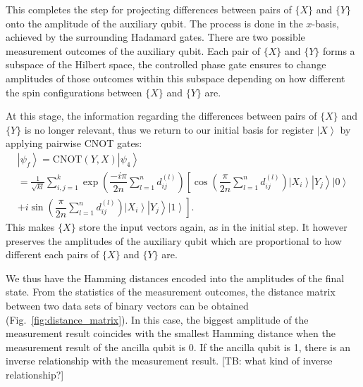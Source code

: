 \documentclass[pra,showkeys,twocolumn,showpacs]{revtex4-1}
\begin{document}
%
This completes the step for projecting differences between pairs of $\{X\}$ and $\{Y\}$ onto the amplitude of the auxiliary qubit. The process is done in the $x$-basis, achieved by the surrounding Hadamard gates. There are two possible measurement outcomes of the auxiliary qubit.  Each pair of $\{X\}$ and $\{Y\}$ forms a subspace of the Hilbert space, the controlled phase gate ensures to change amplitudes of those outcomes within this subspace depending on how different the spin configurations between $\{X\}$ and $\{Y\}$ are.

At this stage, the information regarding the differences between pairs of $\{X\}$ and $\{Y\}$ is no longer relevant, thus we return to our initial basis for register $\left| X \right\rangle$ by applying pairwise CNOT gates:
%
\begin{multline}
    \left| \psi_f \right\rangle = 
    \mathrm{CNOT} (Y,X)\left| \psi_4 \right\rangle \\=  
    \frac{1}{\sqrt{kl}}\sum\limits_{i, j=1}^{k} 
    \exp \left(\dfrac{-i \pi}{2n}\sum\limits_{l=1}^n d^{(l)}_{ij} \right)
				\left[ \cos\left(\dfrac{\pi}{2n}\sum\limits_{l=1}^n d^{(l)}_{ij} \right)
        \left| X_i \right\rangle 
        \left| Y_j \right\rangle 
        \left| 0 \right\rangle\right.
        \\+
        \left. i \sin\left(\dfrac{\pi}{2n}\sum\limits_{l=1}^n d^{(l)}_{ij} \right)
        \left| X_i \right\rangle 
        \left| Y_j \right\rangle 
        \left| 1 \right\rangle\right] .
\end{multline}
%
This makes $\{X\}$ store the input vectors again, as in the initial step. It however preserves the amplitudes of the auxiliary qubit which are proportional to how different each pairs of $\{X\}$ and $\{Y\}$ are.

We thus have the Hamming distances encoded into the amplitudes of the final state. From the statistics of the measurement outcomes, the distance matrix between two data sets of binary vectors can be obtained (Fig.~\ref{fig:distance_matrix}). In this case, the biggest amplitude of the measurement result coincides with the smallest Hamming distance when the measurement result of the ancilla qubit is 0. 
If the ancilla qubit is 1, there is an inverse relationship with the measurement result.  [TB: what kind of inverse relationship?]
\end{document}
